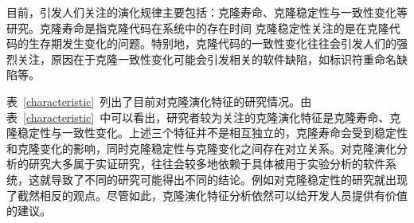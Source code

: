 目前，引发人们关注的演化规律主要包括：克隆寿命、克隆稳定性与一致性变化等研究。克隆寿命是指克隆代码在系统中的存在时间
克隆稳定性关注的是在克隆代码的生存期发生变化的问题。特别地，克隆代码的一致性变化往往会引发人们的强烈关注，原因在于克隆一致性变化可能会引发相关的软件缺陷，如标识符重命名缺陷等。

表~\ref{characteristic}~列出了目前对克隆演化特征的研究情况。由表~\ref{characteristic}~中可以看出，研究者较为关注的克隆演化特征是克隆寿命、克隆稳定性与一致性变化。上述三个特征并不是相互独立的，克隆寿命会受到稳定性和克隆变化的影响，同时克隆稳定性与克隆变化之间存在对立关系。对克隆演化分析的研究大多属于实证研究，往往会较多地依赖于具体被用于实验分析的软件系统，这就导致了不同的研究可能得出不同的结论。例如对克隆稳定性的研究就出现了截然相反的观点。尽管如此，克隆演化特征分析依然可以给开发人员提供有价值的建议。

